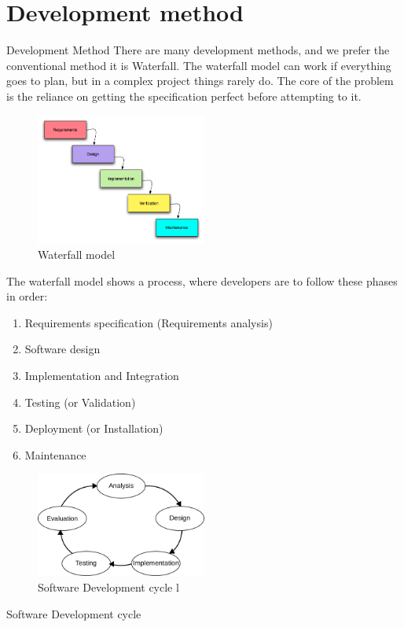 \section{Development method}

Development Method
There are many development methods, and we prefer the conventional method it is Waterfall. The waterfall model can work if everything goes to plan, but in a complex project things rarely do. The core of the problem is the reliance on getting the specification perfect before attempting to it.

\begin{figure}[h]
	\centering
	\includegraphics[width=0.5\textwidth]{Images/development_method_waterfall_model.png}
	\caption{Waterfall model}
	\label{Waterfall}
\end{figure}

The waterfall model shows a process, where developers are to follow these phases in order:
\begin{enumerate}
\item Requirements specification (Requirements analysis)
\item Software design
\item Implementation and Integration
\item Testing (or Validation)
\item Deployment (or Installation)
\item Maintenance
\end{enumerate}

\begin{figure}[h]
	\centering
	\includegraphics[width=0.5\textwidth]{Images/development_method_software_development_cycle.png}
	\caption{Software Development cycle l}
	\label{cyclel}
\end{figure}



Software Development cycle 